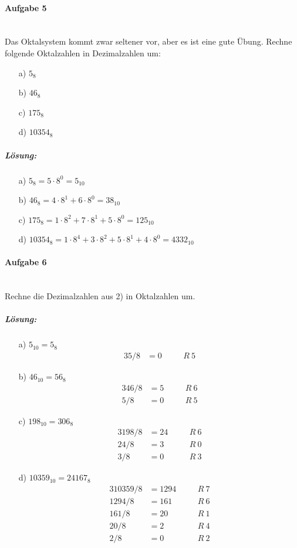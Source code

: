 \documentclass[12pt,a4paper,ngerman]{scrartcl}
\begin{document}
	\paragraph{Aufgabe 5}\mbox{}\\
	Das Oktalsystem kommt zwar seltener vor, aber es ist eine gute Übung. Rechne folgende Oktalzahlen in Dezimalzahlen um:
	\begin{itemize}
		\item[a)] $5_{8}$
		\item[b)] $46_{8}$
		\item[c)] $175_{8}$
		\item[d)] $10354_{8}$
	\end{itemize}

	\subparagraph{Lösung:} 
	\begin{itemize}
		\item[a)] $5_{8} = 5 \cdot 8^0 = 5_{10}$
		\item[b)] $46_{8} = 4 \cdot 8^1 + 6 \cdot 8^0 = 38_{10}$
		\item[c)] $175_{8} = 1 \cdot 8^2 + 7 \cdot 8^1 + 5 \cdot 8^0 = 125_{10}$
		\item[d)] $10354_{8} = 1 \cdot 8^4 + 3 \cdot 8^2 + 5 \cdot 8^1 + 4 \cdot 8^0 = 4332_{10}$
	\end{itemize}

	\paragraph{Aufgabe 6}\mbox{}\\
	Rechne die Dezimalzahlen aus 2) in Oktalzahlen um.
	
	\subparagraph{Lösung:} 
	\begin{itemize}
		\item[a)] $5_{10} = 5_8$
		\begin{alignat*}{3}
		5 / 8 &= 0 && \quad R\ 5
		\end{alignat*}
		
		\item[b)] $46_{10} = 56_8$
		\begin{alignat*}{3}
		46 / 8 &= 5 && \quad R\ 6\\
		5 / 8 &= 0 && \quad R\ 5
		\end{alignat*}
		
		
		\item[c)] $198_{10} = 306_8$
		\begin{alignat*}{3}
		198 / 8 &= 24 && \quad R\ 6\\
		24 / 8 &= 3 && \quad R\ 0\\
		3 / 8 &= 0 && \quad R\ 3
		\end{alignat*}
		
		
		\item[d)] $10359_{10} = 24167_8$
		\begin{alignat*}{3}
		10359 / 8 &= 1294 && \quad R\ 7\\
		1294 / 8 &= 161 && \quad R\ 6\\
		161 / 8 &= 20 && \quad R\ 1\\
		20 / 8 &= 2 && \quad R\ 4\\
		2 / 8 &= 0 && \quad R\ 2
		\end{alignat*}
	\end{itemize}
	
\end{document}
